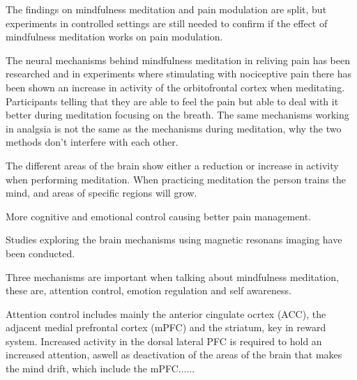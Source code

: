 The findings on mindfulness meditation and pain modulation are split, but experiments in controlled settings are still needed to confirm if the effect of mindfulness meditation works on pain modulation. \cite{Zeidan2012, Perlman2010}




The neural mechanisms behind mindfulness meditation in reliving pain has been researched and in experiments where stimulating with nociceptive pain there has been shown an increase in activity of the orbitofrontal cortex when meditating. Participants telling that they are able to feel the pain but able to deal with it better during meditation focusing on the breath. 
The same mechanisms working in analgsia is not the same as the mechanisms during meditation, why the two methods don't interfere with each other. \cite{Jacob2016}

The different areas of the brain show either a reduction or increase in activity when performing meditation. When practicing meditation the person trains the mind, and areas of specific regions will grow. \cite{Zeidan2012} 

More cognitive and emotional control causing better pain management. 

Studies exploring the brain mechanisms using magnetic resonans imaging have been conducted.

Three mechanisms are important when talking about mindfulness meditation, these are, attention control, emotion regulation and self awareness. 

Attention control includes mainly the anterior cingulate ocrtex (ACC), the adjacent medial prefrontal cortex (mPFC) and the striatum, key in reward system. 
Increased activity in the dorsal lateral PFC is required to hold an increased attention, aswell as deactivation of the areas of the brain that makes the mind drift, which include the mPFC......


